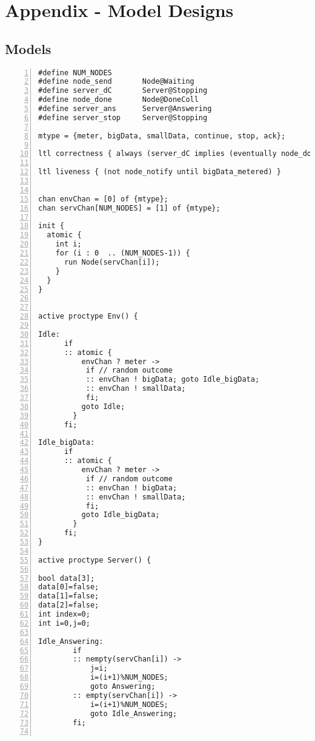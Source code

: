 \chapter{Appendix - Model Designs}

\section{Models} \label{modelDesigns}

\begin{lstlisting}[caption=centralized\_conjunctive\_centralized.pml,language=Promela, numbers=left, basicstyle=\footnotesize, tabsize=2]
#define NUM_NODES       
#define node_send       Node@Waiting 
#define server_dC       Server@Stopping
#define node_done       Node@DoneColl
#define server_ans      Server@Answering
#define server_stop     Server@Stopping

mtype = {meter, bigData, smallData, continue, stop, ack};

ltl correctness { always (server_dC implies (eventually node_done)) }

ltl liveness { (not node_notify until bigData_metered) }


chan envChan = [0] of {mtype};
chan servChan[NUM_NODES] = [1] of {mtype};

init {
  atomic {
    int i;
    for (i : 0  .. (NUM_NODES-1)) {
      run Node(servChan[i]);
    }
  }
}


active proctype Env() {

Idle:  
      if
      :: atomic { 
          envChan ? meter ->  
           if // random outcome 
           :: envChan ! bigData; goto Idle_bigData;
           :: envChan ! smallData;
           fi; 
          goto Idle;
        }
      fi;

Idle_bigData:
      if
      :: atomic { 
          envChan ? meter ->  
           if // random outcome 
           :: envChan ! bigData;
           :: envChan ! smallData;
           fi; 
          goto Idle_bigData;
        }
      fi;       
}

active proctype Server() {

bool data[3];
data[0]=false;
data[1]=false;
data[2]=false;
int index=0; 
int i=0,j=0;

Idle_Answering: 
        if
        :: nempty(servChan[i]) -> 
            j=i;
            i=(i+1)%NUM_NODES;
            goto Answering; 
        :: empty(servChan[i]) ->
            i=(i+1)%NUM_NODES;
            goto Idle_Answering;
        fi;


\end{lstlisting}
